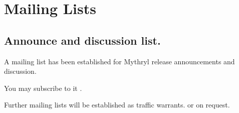 \chapter{Mailing Lists}

%
%

\section{Announce and discussion list.}

A mailing list has been established for Mythryl release announcements and discussion.

You may subscribe to it .

Further mailing lists will be established as traffic warrants. or on request.

